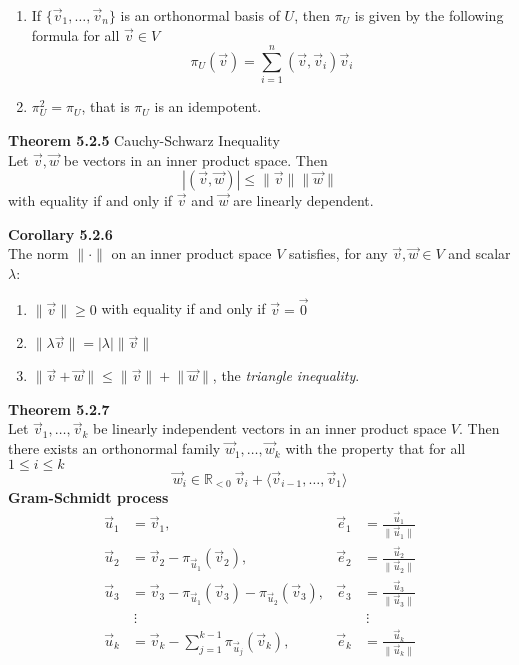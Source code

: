 \documentclass[8pt,landscape]{article}
\begin{document}
\begin{multicols}{3}
\begin{enumerate}
        \item If $\{ \vec{v}_1, \ldots, \vec{v}_n\}$ is an orthonormal basis of $U$,
            then $\pi_U$ is given by the following formula for all $\vec{v} \in V$
            \[
                \pi_U(\vec{v}) = \sum_{i=1}^n (\vec{v}, \vec{v}_i) \vec{v}_i
            \]
        \item $\pi_U^2 = \pi_U$, that is $\pi_U$ is an idempotent.
    \end{enumerate}

    \textbf{Theorem 5.2.5} Cauchy-Schwarz Inequality \\
    Let $\vec{v}, \vec{w}$ be vectors in an inner product space. Then
    \[
        |(\vec{v}, \vec{w})| \leq \lVert \vec{v} \rVert \lVert \vec{w} \rVert
    \]
    with equality if and only if $\vec{v}$ and $\vec{w}$ are linearly dependent.

    \textbf{Corollary 5.2.6} \\
    The norm $\lVert \cdot \rVert$ on an inner product space $V$ satisfies,
    for any $\vec{v}, \vec{w} \in V$ and scalar $\lambda$:
    \begin{enumerate}
        \item $\lVert \vec{v} \rVert \geq 0$ with equality if and only if
            $\vec{v} = \vec{0}$
        \item $\lVert \lambda \vec{v} \rVert = |\lambda| \lVert \vec{v} \rVert$
        \item $\lVert \vec{v} + \vec{w} \rVert \leq
            \lVert \vec{v} \rVert + \lVert \vec{w} \rVert$,
            the \emph{triangle inequality}.
    \end{enumerate}

    \textbf{Theorem 5.2.7} \\
    Let $\vec{v}_1, \ldots, \vec{v}_k$ be linearly independent vectors in an
    inner product space $V$.
    Then there exists an orthonormal family $\vec{w}_1, \ldots, \vec{w}_k$
    with the property that for all $1 \leq i \leq k$
    \[
        \vec{w}_i \in \mathbb{R}_{<0} \ \vec{v}_i +
        \langle \vec{v}_{i-1}, \ldots, \vec{v}_1 \rangle
    \]
    \textbf{Gram-Schmidt process}
    \begin{align*}{}
        \vec{u}_1 &= \vec{v}_1, & \vec{e}_1
                  &= \frac{\vec{u}_1}{\lVert \vec{u}_1 \rVert} \\
        \vec{u}_2 &= \vec{v}_2 - \pi_{\vec{u}_1}(\vec{v}_2), & \vec{e}_2
                  &= \frac{\vec{u}_2}{\lVert \vec{u}_2 \rVert} \\
        \vec{u}_3 &= \vec{v}_3 - \pi_{\vec{u}_1}(\vec{v}_3) -
        \pi_{\vec{u}_2}(\vec{v}_3), & \vec{e}_3 &=
        \frac{\vec{u}_3}{\lVert \vec{u}_3 \rVert} \\
                                    & \ \vdots & & \ \vdots \\
        \vec{u}_k &= \vec{v}_k - \sum_{j=1}^{k-1} \pi_{\vec{u}_j} (\vec{v}_k),
                  & \vec{e}_k &= \frac{\vec{u}_k}{\lVert \vec{u}_k \rVert}
    \end{align*}


\end{multicols}
\end{document}
